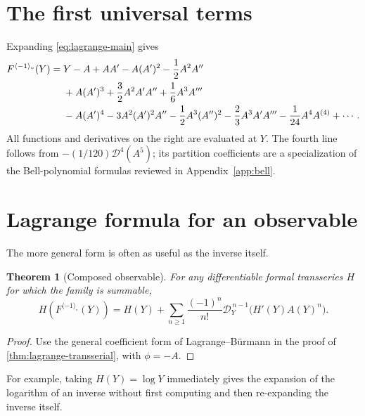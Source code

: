 \documentclass[11pt,oneside]{book}
\newtheorem{theorem}{Theorem}[chapter]
\theoremstyle{definition}
\theoremstyle{remark}
\newcommand{\D}{\mathcal D}
\newcommand{\compinv}{^{\langle-1\rangle_{\circ}}}
\begin{document}
\section{The first universal terms}
Expanding \eqref{eq:lagrange-main} gives
\begin{align}
 F\compinv(Y)={}&Y-A+AA'
 -A(A')^2-\frac12A^2A''\notag\\
 &+A(A')^3+\frac32A^2A'A''+\frac16A^3A'''\notag\\
 &-A(A')^4-3A^2(A')^2A''-\frac12A^3(A'')^2
 -\frac23A^3A'A'''-\frac1{24}A^4A^{(4)}+\cdots.
 \label{eq:lagrange-first-terms}
\end{align}
All functions and derivatives on the right are evaluated at $Y$.  The fourth
line follows from $-(1/120)\D^4(A^5)$; its partition coefficients are a
specialization of the Bell-polynomial formulas reviewed in
Appendix~\ref{app:bell}.

\section{Lagrange formula for an observable}
The more general form is often as useful as the inverse itself.

\begin{theorem}[Composed observable]
For any differentiable formal transseries $H$ for which the family is
summable,
\begin{equation}\label{eq:lagrange-observable}
 H(F\compinv(Y))
 =H(Y)+\sum_{n\ge1}\frac{(-1)^n}{n!}
 \D_Y^{\,n-1}\bigl(H'(Y)A(Y)^n\bigr).
\end{equation}
\end{theorem}
\begin{proof}
Use the general coefficient form of Lagrange--B\"urmann in the proof of
\cref{thm:lagrange-transserial}, with $\phi=-A$.
\end{proof}

For example, taking $H(Y)=\log Y$ immediately gives the expansion of the
logarithm of an inverse without first computing and then re-expanding the
inverse itself.
\end{document}
